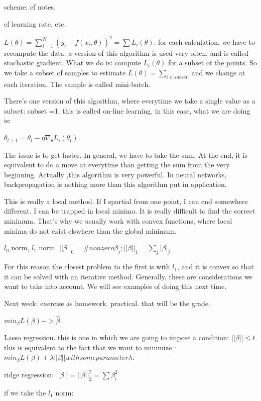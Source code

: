 scheme: cf notes.

cf learning rate, etc.

$L(\theta) = \sum_{i=1}^N (y_i - f(x_i,\theta))^2
= \sum L_i(\theta)$.
for each calculation, we have to recompute the data.
a version of this algorithm is used very often, and is called stochastic gradient.
What we do is: compute $L_i(\theta)$ for a subset of the points.
So we take a subset of samples to estimate $L(\theta) = \sum_{i\in subset}$ and we
change at each iteration.
The sample is called mini-batch.

There's one version of this algorithm, where everytime we take a single value as
a subset: subset =1. this is called on-line learning. in this case, what we are
doing is:

$\theta_{t+1} = \theta_{t} - \eta \nabla_\theta L_i(\theta_{t})$.

The issue is to get faster. In general, we have to take the sum.
At the end, it is equivalent to do a move at everytime than getting the sum from
the very beginning.
Actually ,this algorithm is very powerful. In neural networks, backpropagation
is nothing more than this algorithm put in application.

This is really a local method. If I spartial from one point, I can end somewhere
different. I can be trapped in local minima. It is really difficult to find the 
correct minimum. That's why we usually work with convex functions, where local
minima do not exist elswhere than the global minimum.

$l_0$ norm, $l_1$ norm.
$||\beta||_0 = \# nonzero \beta_j ; ||\beta||_1 = \sum_j |\beta|_j$

For this reason the closest problem to the first is with $l_1$, and it is convex
so that it can be solved with an iterative method. Generally, these are
considerations we want to take into account.
We will see examples of doing this next time.

Next week: exercise as homework. practical.
that will be the grade.

$min_\beta L(\beta) -> \hat \beta$

Lasso regression.
this is one in which we are going to impose a condition:
$||\beta|| \leq t$
this is equivalent to the fact that we want to minimize :
$min_\beta L(\beta) + \lambda ||\beta|| with some parameter \lambda.$

ridge regression: $||\beta|| = ||\beta||_2^2
= \sum \beta_i^2$

if we take the $l_1$ norm:


